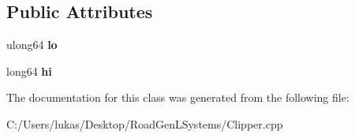 \subsection*{Public Attributes}
\begin{DoxyCompactItemize}
\item 
\hypertarget{class_clipper_lib_1_1_int128_a991b9da6e53c777a94fca640e505b258}{}\label{class_clipper_lib_1_1_int128_a991b9da6e53c777a94fca640e505b258} 
ulong64 {\bfseries lo}
\item 
\hypertarget{class_clipper_lib_1_1_int128_a167643d0860a14fb563e055511e15e14}{}\label{class_clipper_lib_1_1_int128_a167643d0860a14fb563e055511e15e14} 
long64 {\bfseries hi}
\end{DoxyCompactItemize}


The documentation for this class was generated from the following file\+:\begin{DoxyCompactItemize}
\item 
C\+:/\+Users/lukas/\+Desktop/\+Road\+Gen\+L\+Systems/Clipper.\+cpp\end{DoxyCompactItemize}
